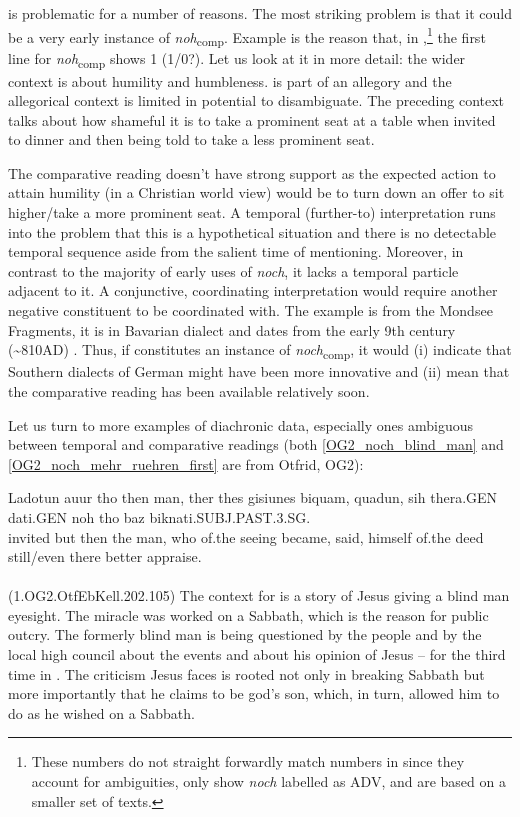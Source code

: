 \documentclass[output=paper]{langsci/langscibook}
\begin{document}
 is problematic for a number of reasons. The most striking problem is that it could be a very early instance of \textit{noh}\textsubscript{comp}. Example  is the reason that, in ,\footnote{These numbers do not straight forwardly match numbers in  since they account for ambiguities, only show \textit{noch} labelled as ADV, and are based on a smaller set of texts.} the first line for \textit{noh}\textsubscript{comp} shows 1 (1/0?). Let us look at it in more detail: the wider context is about humility and humbleness.  is part of an allegory and the allegorical context is limited in potential to disambiguate. The preceding context talks about how shameful it is to take a prominent seat at a table when invited to dinner and then being told to take a less prominent seat.

The comparative reading doesn't have strong support as the expected action to attain humility (in a Christian world view) would be to turn down an offer to sit higher/take a more prominent seat. A temporal (further-to) interpretation runs into the problem that this is a hypothetical situation and there is no detectable temporal sequence aside from the salient time of mentioning. Moreover, in contrast to the majority of early uses of \textit{noch}, it lacks a temporal particle adjacent to it. A conjunctive, coordinating interpretation would require another negative constituent to be coordinated with. The example is from the Mondsee Fragments, it is in Bavarian dialect and dates from the early 9th century (\textasciitilde 810AD) \citep{annis_og}. Thus, if  constitutes an instance of \textit{noch}\textsubscript{comp}, it would (i) indicate that Southern dialects of German might have been more innovative and (ii) mean that the comparative reading has been available relatively soon.

Let us turn to more examples of diachronic data, especially ones ambiguous between temporal and comparative readings (both \ref{OG2_noch_blind_man} and \ref{OG2_noch_mehr_ruehren_first} are from Otfrid, OG2):

\ea\gll Ladotun auur tho then man, ther thes gisiunes biquam, quadun, sih thera.GEN dati.GEN noh tho baz biknati.SUBJ.PAST.3.SG.\\
       invited but then the man, who of.the seeing became, said, himself of.the deed still/even there better appraise.\\
\label{OG2_noch_blind_man} \\ \hfill (1.OG2.OtfEbKell.202.105)
\z
The context for  is a story of Jesus giving a blind man eyesight. The miracle was worked on a Sabbath, which is the reason for public outcry. The formerly blind man is being questioned by the people and by the local high council about the events and about his opinion of Jesus -- for the third time in . The criticism Jesus faces is rooted not only in breaking Sabbath but more importantly that he claims to be god's son, which, in turn, allowed him to do as he wished on a Sabbath.
\end{document}
